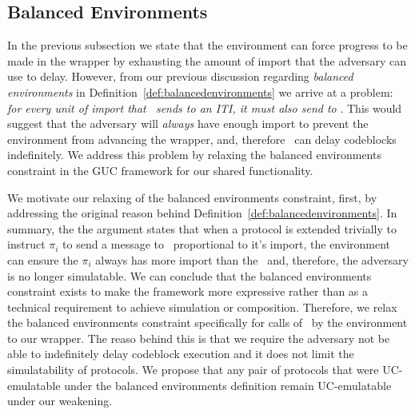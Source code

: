 \subsection{Balanced Environments}
In the previous subsection we state that the environment can force progress to be made in the wrapper by exhausting the amount of import that the adversary can use to delay.
However, from our previous discussion regarding \textit{balanced environments} in Definition~\ref{def:balancedenvironments} we arrive at a problem: \textit{for every unit of import that \Environment~sends to an ITI, it must also send to \Adversary}.
This would suggest that the adversary will \textit{always} have enough import to prevent the environment from advancing the wrapper, and, therefore \Adversary~can delay codeblocks indefinitely.
We address this problem by relaxing the balanced environments constraint in the GUC framework for our shared functionality.

We motivate our relaxing of the balanced environments constraint, first, by addressing the original reason behind Definition~\ref{def:balancedenvironments}.
In summary, the the argument states that when a protocol is extended trivially to instruct $\pi_i$ to send a message to \Adversary~proportional to it's import, the environment can ensure the $\pi_i$ always has more import than the \Adversary~and, therefore, the adversary is no longer simulatable. 
We can conclude that the balanced environments constraint exists to make the framework more expressive rather than as a technical requirement to achieve simulation or composition. 
Therefore, we relax the balanced environments constraint specifically for calls of \Advance~by the environment to our wrapper.
The reaso behind this is that we require the adversary not be able to indefinitely delay codeblock execution and it does not limit the simulatability of protocols.
We propose that any pair of protocols that were UC-emulatable under the balanced environments definition remain UC-emulatable under our weakening.






